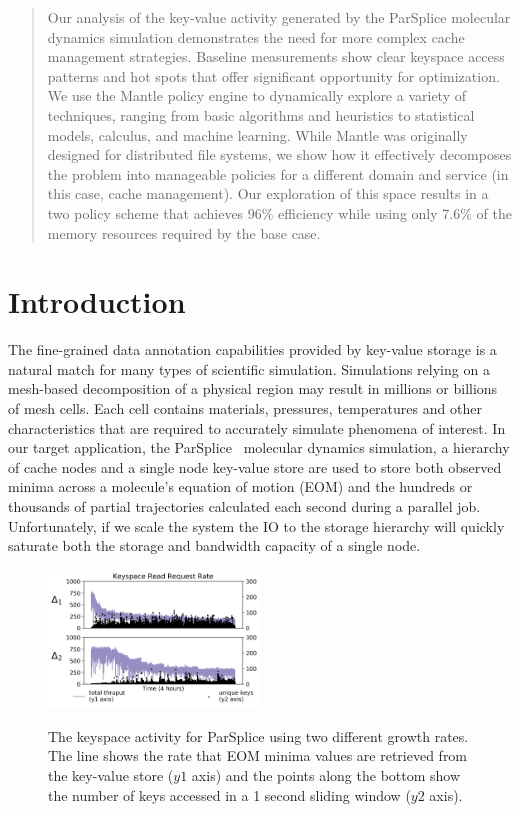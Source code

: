 \begin{abstract}

Our analysis of the key-value activity generated by the ParSplice molecular
dynamics simulation demonstrates the need for more complex cache management
strategies. Baseline measurements show clear keyspace access patterns and hot
spots that offer significant opportunity for optimization. We use the Mantle
policy engine to dynamically explore a variety of techniques, ranging from
basic algorithms and heuristics to statistical models, calculus, and machine
learning. While Mantle was originally designed for distributed file systems, we
show how it effectively decomposes the problem into manageable policies for a
different domain and service (in this case, cache management).  Our exploration
of this space results in a two policy scheme that achieves 96\% efficiency
while using only 7.6\% of the memory resources required by the base case. 

\end{abstract}

\section{Introduction}

The fine-grained data annotation capabilities provided by key-value storage is
a natural match for many types of scientific simulation. Simulations relying on
a mesh-based decomposition of a physical region may result in millions or
billions of mesh cells. Each cell contains materials, pressures, temperatures
and other characteristics that are required to accurately simulate phenomena of
interest. In our target application, the
ParSplice~\cite{perez:jctc20150parsplice} molecular dynamics simulation, a
hierarchy of cache nodes and a single node key-value store are used to store
both observed minima across a molecule's equation of motion (EOM) and the
hundreds or thousands of partial trajectories calculated each second during a
parallel job. Unfortunately, if we scale the system the IO to the storage
hierarchy will quickly saturate both the storage and bandwidth capacity of a
single node. 

\begin{figure}[t]
  \noindent\includegraphics[width=0.5\textwidth]{figures/motivation-regimes.png}\\
  \caption{The keyspace activity for ParSplice using two different growth
rates.  The line shows the rate that EOM minima values are retrieved from the
key-value store (\(y1\) axis) and the points along the bottom show the number
of keys accessed in a 1 second sliding window (\(y2\) axis).
\label{fig:motivation-regimes}}
\end{figure}

